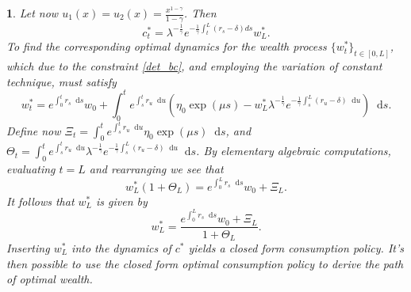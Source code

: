 \documentclass[11pt,oneside,english,reqno,dvipsnames,table]{amsart}
\numberwithin{equation}{section}
\theoremstyle{plain}
\theoremstyle{definition}
\theoremstyle{remark}
\theoremstyle{plain}
\theoremstyle{plain}
\theoremstyle{plain}
\theoremstyle{plain}
\theoremstyle{plain}
\newtheorem{ex}[thm]{\protect\examplename}
\theoremstyle{plain}
\theoremstyle{plain}
\providecommand{\examplename}{Example}
\newcommand{\dd}{\mathop{}\!\mathrm{d}}
\numberwithin{thm}{section}
\begin{document}
\begin{ex}\label{ex:deterministic_crra}
    Let now $u_1(x)=u_2(x)=\frac{x^{1-\gamma}}{1-\gamma}$. Then
%
\begin{equation}\label{det_c_forms}
     c_t^* =  \lambda^{-\frac{1}{\gamma}} e^{-\frac{1}{\gamma} \int_t^L (r_s-\delta)ds }  w^*_L. 
\end{equation}
%
To find the corresponding optimal dynamics for the wealth process $\{w^*_t\}_{t\in [0,L]}$, which due to the constraint  \eqref{det_bc}, and employing the variation of constant technique,  must satisfy
%
\begin{equation*}
    w_t^* = e^{\int_0^t r_s \dd s }w_0 +\int_0^t e^{\int_s^t r_u \dd u } (\eta_0\exp(\mu s)-w^*_L\lambda^{-\frac{1}{\gamma}} e^{-\frac{1}{\gamma} \int_s^L (r_u-\delta)\dd u })\dd s.  
\end{equation*}
%
Define now $\Xi_t = \int_0^t e^{\int_s^t r_u \dd u } \eta_0\exp(\mu s)\dd s$, and $\Theta_t =\int_0^t e^{\int_s^t r_u \dd u }\lambda^{-\frac{1}{\gamma}} e^{-\frac{1}{\gamma} \int_s^L (r_u-\delta)\dd u }\dd s$. 
By elementary algebraic computations,
evaluating $t=L$ and rearranging we see that
\[
    w_L^*(1 + \Theta_L) = e^{\int_0^Lr_s \dd s }w_0 +\Xi_L.  
\]
It follows that $w_L^*$ is given by 
\begin{equation*}
    w_L^* = \frac{e^{\int_0^Lr_s \dd s }w_0+\Xi_L}{1+\Theta_L}.  
\end{equation*}
Inserting $w_L^*$ into the dynamics of $c^*$ yields a closed form consumption policy.
It's then possible to use the closed form optimal consumption policy to derive the path of optimal wealth.


\end{ex}
\end{document}

